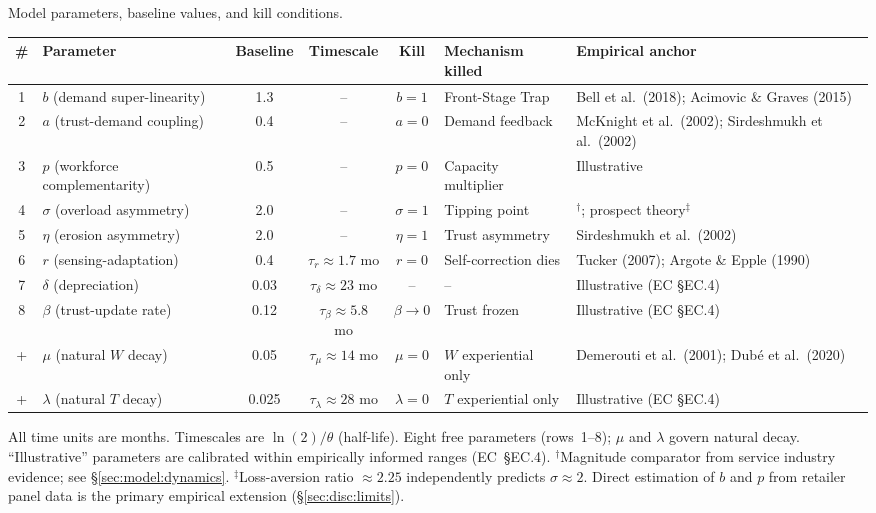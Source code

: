 \documentclass[msom,dblanonrev]{informs4}
\begin{document}
\begin{table}
\TABLE
{Model parameters, baseline values, and kill conditions.\label{tab:params}}
{{\setlength{\tabcolsep}{3pt}\small
\begin{tabular}{@{}cp{}cccp{}p{}@{}}
\toprule
\# & Parameter & Baseline & Timescale & Kill & Mechanism killed & Empirical anchor \\
\midrule
1 & $b$ (demand super-linearity) & 1.3 & -- & $b{=}1$ & Front-Stage Trap & Bell et al.\ (2018); Acimovic \& Graves (2015) \\
2 & $a$ (trust-demand coupling) & 0.4 & -- & $a{=}0$ & Demand feedback & McKnight et al.\ (2002); Sirdeshmukh et al.\ (2002) \\
3 & $p$ (workforce complementarity) & 0.5 & -- & $p{=}0$ & Capacity multiplier & Illustrative \\
4 & $\sigma$ (overload asymmetry) & 2.0 & -- & $\sigma{=}1$ & Tipping point & \citet{oliva2001cutting}$^\dagger$; prospect theory$^\ddagger$ \\
5 & $\eta$ (erosion asymmetry) & 2.0 & -- & $\eta{=}1$ & Trust asymmetry & Sirdeshmukh et al.\ (2002) \\
6 & $r$ (sensing-adaptation) & 0.4 & $\tau_{r} \approx 1.7$ mo & $r{=}0$ & Self-correction dies & Tucker (2007); Argote \& Epple (1990) \\
7 & $\delta$ (depreciation) & 0.03 & $\tau_{\delta} \approx 23$ mo & -- & -- & Illustrative (EC \S EC.4) \\
8 & $\beta$ (trust-update rate) & 0.12 & $\tau_{\beta} \approx 5.8$ mo & $\beta{\to}0$ & Trust frozen & Illustrative (EC \S EC.4) \\
\addlinespace
+ & $\mu$ (natural $W$ decay) & 0.05 & $\tau_{\mu} \approx 14$ mo & $\mu{=}0$ & $W$ experiential only & Demerouti et al.\ (2001); Dub\'e et al.\ (2020) \\
+ & $\lambda$ (natural $T$ decay) & 0.025 & $\tau_{\lambda} \approx 28$ mo & $\lambda{=}0$ & $T$ experiential only & Illustrative (EC \S EC.4) \\
\bottomrule
\end{tabular}
}}{All time units are months. Timescales are $\ln(2)/\theta$ (half-life). Eight free parameters (rows~1--8); $\mu$ and $\lambda$ govern natural decay. ``Illustrative'' parameters are calibrated within empirically informed ranges (EC~\S EC.4). $^\dagger$Magnitude comparator from service industry evidence; see \S\ref{sec:model:dynamics}. $^\ddagger$Loss-aversion ratio $\approx 2.25$ \citep{tversky1992advances} independently predicts $\sigma \approx 2$. Direct estimation of $b$ and $p$ from retailer panel data is the primary empirical extension (\S\ref{sec:disc:limits}).}\end{table}
\end{document}
